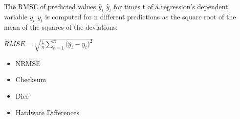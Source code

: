 The RMSE of predicted values ${\displaystyle {\hat {y}}_{t}}$ $\hat y_t$ for times t of a regression's dependent variable ${\displaystyle y_{t}}$ $y_{t}$ is computed for n different predictions as the square root of the mean of the squares of the deviations:\\
\begin{center}
  $RMSE = {\sqrt {\frac{1} {n}{\sum\limits_{t = 1}^n {(\hat{y}_{t} - {y}_{t} } })^{2} } }$
\end{center}

\begin{itemize}
\item NRMSE
\item Checksum
\item Dice
\item Hardware Differences
\end{itemize}
